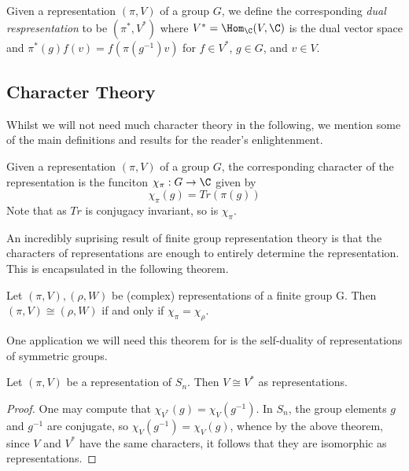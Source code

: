 \documentclass[../main.tex]{subfiles}
\begin{document}
\begin{definition}
    Given a representation $ (\pi,V) $ of a group $ G $, we define the corresponding \textit{dual respresentation} to be $ (\pi^{*}, V^{*}) $ where $ V^{*}=\Hom_{\C}(V,\C) $ is the dual vector space and $ \pi^{*}(g)f(v) = f(\pi(g^{-1})v) $ for $ f\in V^{*} $, $ g\in G $, and $ v\in V $.
\end{definition}



\subsection{Character Theory}

Whilst we will not need much character theory in the following, we mention some of the main definitions and results for the reader's enlightenment.

\begin{definition}
    Given a representation $ (\pi,V) $ of a group $ G $, the corresponding character of the representation is the funciton $ \chi_{\pi}:G\to \C $ given by
    \[
        \chi_{\pi} (g) = Tr(\pi(g))
    \]
    Note that as $ Tr $ is conjugacy invariant, so is $ \chi_{\pi} $.
\end{definition}

An incredibly suprising result of finite group representation theory is that the characters of representations are enough to entirely determine the representation. This is encapsulated in the following theorem.

\begin{theorem}
    Let $ (\pi,V),(\rho,W) $ be (complex) representations of a finite group G. Then $ (\pi,V)\cong (\rho,W) $ if and only if $ \chi_{\pi}= \chi_{\rho} $.
\end{theorem}

One application we will need this theorem for is the self-duality of representations of symmetric groups. 

\begin{proposition}
    Let $ (\pi,V) $ be a representation of $ S_{n} $. Then $ V\cong V^{*} $ as representations.
\end{proposition}
\begin{proof}
    One may compute that $ \chi_{V^{*}}(g) = \chi_{V}(g^{-1})  $. In $ S_{n} $, the group elements $ g $ and $ g^{-1} $ are conjugate, so $ \chi_{V}(g^{-1})= \chi_{V}(g) $, whence by the above theorem, since $ V $ and $ V^{*} $ have the same characters, it follows that they are isomorphic as representations.
\end{proof}
\end{document}
